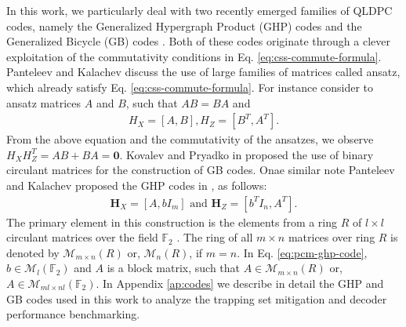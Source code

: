 \documentclass[%
 reprint,
 amsmath,amssymb,
 aps,
pra,
showkeys,
]{revtex4-2}
\begin{document}
In this work, we particularly deal with two recently emerged families of QLDPC codes, namely the Generalized Hypergraph Product (GHP) codes \cite{panteleev2021degenerate} and the Generalized Bicycle (GB) codes \cite{kovalev2013quantum}.
Both of these codes originate through a clever exploitation of the commutativity conditions in Eq. \ref{eq:css-commute-formula}.
Panteleev and Kalachev discuss the use of large families of matrices called ansatz, which already satisfy Eq. \ref{eq:css-commute-formula}.
For instance consider to ansatz matrices $A$ and $B$, such that $AB=BA$ and 
\begin{align}
    \label{eq:pcm-gb-code}
    H_X = [A, B] , H_Z = [B^T, A^T].
\end{align}
From the above equation and the commutativity of the ansatzes, we observe $H_XH_Z^{T} = AB + BA = \mathbf{0}$.
Kovalev and Pryadko in \cite{kovalev2013quantum} proposed the use of binary circulant matrices for the construction of GB codes.
Onae similar note Panteleev and Kalachev proposed the GHP codes in \cite{panteleev2021degenerate}, as follows:
\begin{align}
\label{eq:pcm-ghp-code}
    \mathbf{H}_X = [A,bI_m] \,\,\text{and}\,\, \mathbf{H}_Z = [b^TI_n,A^T].
\end{align}
The primary element in this construction is the elements from a ring $R$ of $l \times l$ circulant matrices over the field $\mathbb{F}_2$ \cite{panteleev2021degenerate}.
The ring of all $m \times n$ matrices over ring $R$ is denoted by $\mathcal{M}_{m \times n}(R)$ or,  $\mathcal{M}_{n}(R)$, if $m = n$.
In Eq. \ref{eq:pcm-ghp-code}, $b \in \mathcal{M}_l(\mathbb{F}_2)$ and $A$ is a block matrix, such that $A \in \mathcal{M}_{m \times n}(R)$ or, $A \in \mathcal{M}_{ml \times nl}(\mathbb{F}_2)$.
In Appendix \ref{ap:codes} we describe in detail the GHP and GB codes used in this work to analyze the trapping set mitigation and decoder performance benchmarking.
\end{document}
